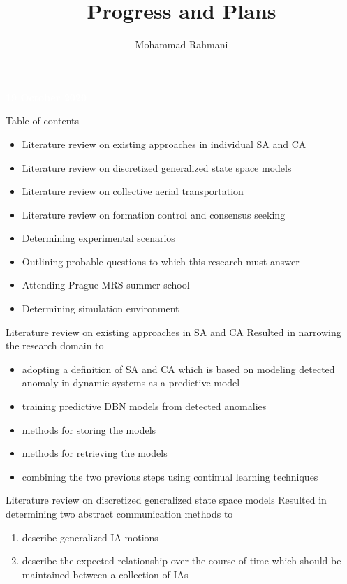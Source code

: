 \documentclass[unknownkeysallowed]{beamer}
\title{Progress and Plans}
\author{Mohammad Rahmani}
\institute{Decide Doctoral School}
\begin{document}
	\begin{frame}
		\date{}
		\maketitle
		\textcolor{white}{\textbf{19 October 2020}}
	\end{frame}
	
	\begin{frame}{Table of contents}
		\begin{itemize}
			\item Literature review on existing approaches in individual SA and CA
			\item Literature review on discretized generalized state space models
			\item Literature review on collective aerial transportation
			\item Literature review on formation control and consensus seeking
			\item Determining experimental scenarios
			\item Outlining probable questions to which this research must answer
			\item Attending Prague MRS summer school
			\item Determining simulation environment
		\end{itemize}
	\end{frame}

	\begin{frame}{Literature review on existing approaches in SA and CA}
		Resulted in narrowing the research domain to
		\begin{itemize}
			\item adopting a definition of SA and CA which is based on modeling detected anomaly in dynamic systems as a predictive model
			\item training predictive DBN models from detected anomalies 
			\item methods for storing the models
			\item methods for retrieving the models
			\item combining the two previous steps using continual learning techniques
		\end{itemize}
	\end{frame}

	\begin{frame}{Literature review on discretized generalized state space models}
	 Resulted in determining two abstract communication methods to
		\begin{enumerate}
			\item describe generalized IA motions
			\item describe the expected relationship over the course of time which should be maintained between a collection of IAs 
		\end{enumerate}
	\end{frame}
\end{document}
